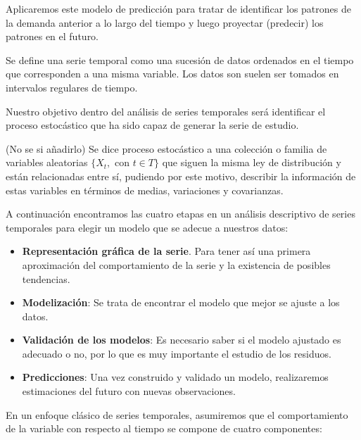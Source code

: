 \documentclass[12pt,a4paper,]{book}
\providecommand{\tightlist}{%
  \setlength{\itemsep}{0pt}\setlength{\parskip}{0pt}}
\numberwithin{dummy}{section}
\theoremstyle{ocrenumbox}
\theoremstyle{blacknumex}
\theoremstyle{blacknumbox}
\theoremstyle{ocrenum}
\theoremstyle{ocrenum}
\begin{document}
Aplicaremos este modelo de predicción para tratar de identificar los
patrones de la demanda anterior a lo largo del tiempo y luego proyectar
(predecir) los patrones en el futuro.

Se define una serie temporal como una sucesión de datos ordenados en el
tiempo que corresponden a una misma variable. Los datos son suelen ser
tomados en intervalos regulares de tiempo.

Nuestro objetivo dentro del análisis de series temporales será
identificar el proceso estocástico que ha sido capaz de generar la serie
de estudio.

(No se si añadirlo) Se dice proceso estocástico a una colección o
familia de variables aleatorias \(\{X_t, \text{ con } t \in T \}\) que
siguen la misma ley de distribución y están relacionadas entre sí,
pudiendo por este motivo, describir la información de estas variables en
términos de medias, variaciones y covarianzas.

A continuación encontramos las cuatro etapas en un análisis descriptivo
de series temporales para elegir un modelo que se adecue a nuestros
datos:

\begin{itemize}
\tightlist
\item
  \textbf{Representación gráfica de la serie}. Para tener así una
  primera aproximación del comportamiento de la serie y la existencia de
  posibles tendencias.
\item
  \textbf{Modelización}: Se trata de encontrar el modelo que mejor se
  ajuste a los datos.
\item
  \textbf{Validación de los modelos}: Es necesario saber si el modelo
  ajustado es adecuado o no, por lo que es muy importante el estudio de
  los residuos.
\item
  \textbf{Predicciones}: Una vez construido y validado un modelo,
  realizaremos estimaciones del futuro con nuevas observaciones.
\end{itemize}

En un enfoque clásico de series temporales, asumiremos que el
comportamiento de la variable con respecto al tiempo se compone de
cuatro componentes:
\end{document}
